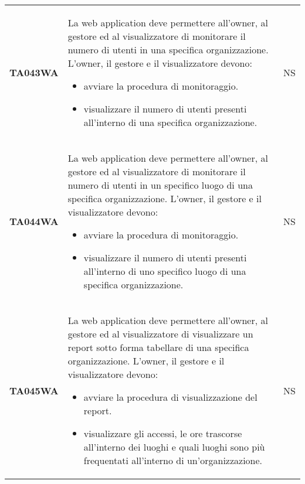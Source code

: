 \documentclass[../../piano-di-qualifica.tex]{subfiles}
\begin{document}
\begin{longtable}[H]{>{\centering\bfseries}m{3cm} >{}m{10cm} >{\centering\arraybackslash}m{3cm}}
  TA043WA           & La web application deve permettere all'owner, al gestore ed al visualizzatore di monitorare il numero di utenti in una specifica organizzazione. \newline
  L'owner, il gestore e il visualizzatore devono:
  \begin{itemize}
    \item avviare la procedura di monitoraggio.
    \item visualizzare il numero di utenti presenti all'interno di una specifica organizzazione.
  \end{itemize}
                    & NS                                                                                                                                                                                                                                                               \\
  TA044WA           & La web application deve permettere all'owner, al gestore ed al visualizzatore di monitorare il numero di utenti in un specifico luogo di una specifica organizzazione. \newline
  L'owner, il gestore e il visualizzatore devono:
  \begin{itemize}
    \item avviare la procedura di monitoraggio.
    \item visualizzare il numero di utenti presenti all'interno di uno specifico luogo di una specifica organizzazione.
  \end{itemize}
                    & NS                                                                                                                                                                                                                                                               \\
  TA045WA           & La web application deve permettere all'owner, al gestore ed al visualizzatore di visualizzare un report sotto forma tabellare di una specifica organizzazione. \newline
  L'owner, il gestore e il visualizzatore devono:
  \begin{itemize}
    \item avviare la procedura di visualizzazione del report.
    \item visualizzare gli accessi, le ore trascorse all'interno dei luoghi e quali luoghi sono più frequentati all'interno di un'organizzazione.
  \end{itemize}
                    & NS                                                                                                                                                                                                                                                               \\

\end{longtable}
\end{document}
